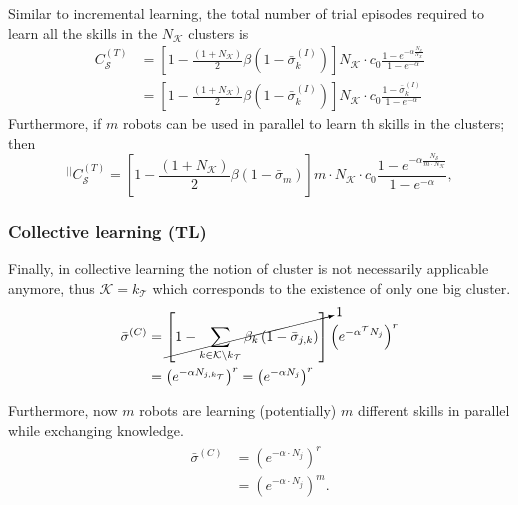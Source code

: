 Similar to incremental learning, the total number of trial episodes required to learn all the skills in the $ N_\mathcal{K} $ clusters is
\begin{align}\label{eq:complexity_transfer_single}
	C_\mathcal{S}^{(T)} &= \left[1 - \frac{\left(1+N_\mathcal{K}\right)}{2}\beta \left(1-\bar{\sigma}^{(I)}_k\right)\right] N_\mathcal{K} \cdot  c_0 \frac{1 - e^{-\alpha \frac{N_\mathcal{S}}{N_\mathcal{K}}}}{1 - e^{-\alpha}}\\
	&= \left[1 - \frac{\left(1+N_\mathcal{K}\right)}{2}\beta \left(1-\bar{\sigma}^{(I)}_k\right)\right] N_\mathcal{K} \cdot  c_0 \frac{1 - \bar{\sigma}^{(I)}_k}{1 - e^{-\alpha}}	
\end{align}
Furthermore, if $ m $ robots can be used in parallel to learn th skills in the clusters; then
\begin{equation}\label{eq:complexity_transfer_parallel}
	{}^{\lvert \lvert}C_\mathcal{S}^{(T)} = \left[1 - \frac{\left(1+N_\mathcal{K}\right)}{2}\beta \left(1-\bar{\sigma}_m\right)\right] m \cdot N_\mathcal{K}  \cdot c_0 \frac{1 - e^{-\alpha \frac{N_\mathcal{S}}{m \cdot N_\mathcal{K}}}}{1 - e^{-\alpha}},
\end{equation}
\subsubsection{\textbf{Collective learning (TL)}}
Finally, in collective learning the notion of cluster is not necessarily applicable anymore, thus 
$\mathcal{K} = k_\mathcal{T}$ which corresponds to the existence of only one big cluster.
\begin{align}
	\begin{split}
		\bar{\sigma}^{(C)} &=   \cancelto{1}{ \left[1- \sum_{k \in \mathcal{K} \setminus k_\mathcal{T}}\beta_k \left( 1 - \bar{\sigma}_{j,k} \right)\right]} \left(e^{-\alpha {{^\mathcal{T}}N_j}} \right)^r \\%
		&= \left(e^{-\alpha N_{j,k_\mathcal{T}}} \right)^r  = \left(e^{-\alpha N_{j}}\right)^r 
	\end{split}
\end{align}

Furthermore, now $m$ robots are learning (potentially) $m$ different skills in parallel while exchanging knowledge.
\begin{align}
\begin{split}
    \bar{\sigma}^{(C)} &= \left({e^{-\alpha \cdot N_j}}\right)^{r}\\
    &= \left({e^{-\alpha \cdot N_j}}\right)^{m}.
\end{split}
\end{align}

